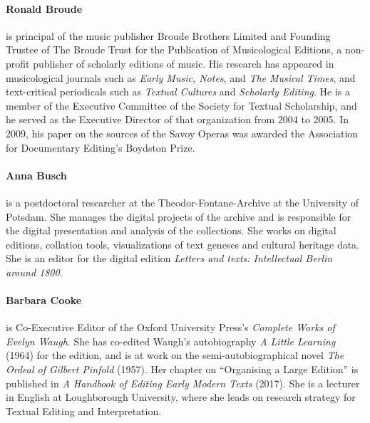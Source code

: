 \paragraph{Ronald Broude} is principal of the music publisher Broude Brothers Limited and Founding Trustee of The Broude Trust for the Publication of Musicological Editions, a non-profit publisher of scholarly editions of music. His research has appeared in musicological journals such as \textit{Early Music, Notes}, and \textit{The Musical Times}, and text-critical periodicals such as \textit{Textual Cultures} and \textit{Scholarly Editing}. He is a member of the Executive Committee of the Society for Textual Scholarship, and he served as the Executive Director of that organization from 2004 to 2005. In 2009, his paper on the sources of the Savoy Operas was awarded the Association for Documentary Editing’s Boydston Prize.

\paragraph{Anna Busch} is a postdoctoral researcher at the Theodor-Fontane-Archive at the University of Potsdam. She manages the digital projects of the archive and is responsible for the digital presentation and analysis of the collections. She works on digital editions, collation tools, visualizations of text geneses and cultural heritage data. She is an editor for the digital edition \emph{Letters and texts: Intellectual Berlin around 1800}.

\paragraph{Barbara Cooke} is Co-Executive Editor of the Oxford University Press's
\emph{Complete Works of Evelyn Waugh}. She has co-edited Waugh's
autobiography \emph{A Little Learning} (1964) for the edition, and is at
work on the semi-autobiographical novel \emph{The Ordeal of Gilbert
Pinfold} (1957). Her chapter on ``Organising a Large Edition'' is
published in \emph{A Handbook of Editing Early Modern Texts} (2017). She
is a lecturer in English at Loughborough University, where she leads on
research strategy for Textual Editing and Interpretation.

